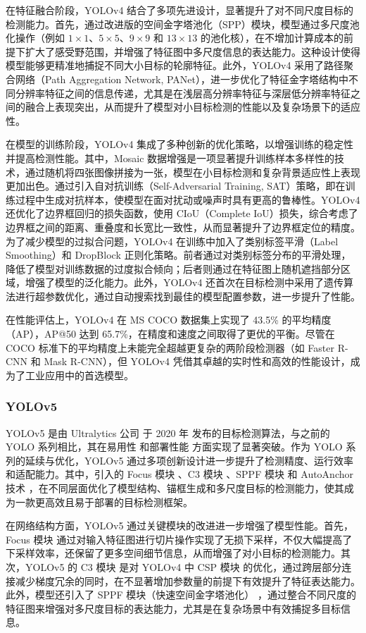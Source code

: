 \documentclass[11pt,twocolumn]{ctexart}
\begin{document}
在特征融合阶段，YOLOv4 结合了多项先进设计，显著提升了对不同尺度目标的检测能力。首先，通过改进版的空间金字塔池化（SPP）模块，模型通过多尺度池化操作（例如 $1\times1$、$5\times5$、$9\times9$ 和 $13\times13$ 的池化核），在不增加计算成本的前提下扩大了感受野范围，并增强了特征图中多尺度信息的表达能力。这种设计使得模型能够更精准地捕捉不同大小目标的轮廓特征。此外，YOLOv4 采用了路径聚合网络（Path Aggregation Network, PANet）\cite{liu2018path}，进一步优化了特征金字塔结构中不同分辨率特征之间的信息传递，尤其是在浅层高分辨率特征与深层低分辨率特征之间的融合上表现突出，从而提升了模型对小目标检测的性能以及复杂场景下的适应性。

在模型的训练阶段，YOLOv4 集成了多种创新的优化策略，以增强训练的稳定性并提高检测性能。其中，Mosaic 数据增强是一项显著提升训练样本多样性的技术，通过随机将四张图像拼接为一张，模型在小目标检测和复杂背景适应性上表现更加出色。通过引入自对抗训练（Self-Adversarial Training, SAT）策略，即在训练过程中生成对抗样本，使模型在面对扰动或噪声时具有更高的鲁棒性。YOLOv4 还优化了边界框回归的损失函数，使用 CIoU（Complete IoU）损失，综合考虑了边界框之间的距离、重叠度和长宽比一致性，从而显著提升了边界框定位的精度。为了减少模型的过拟合问题，YOLOv4 在训练中加入了类别标签平滑（Label Smoothing）和 DropBlock 正则化策略。前者通过对类别标签分布的平滑处理，降低了模型对训练数据的过度拟合倾向；后者则通过在特征图上随机遮挡部分区域，增强了模型的泛化能力。此外，YOLOv4 还首次在目标检测中采用了遗传算法进行超参数优化，通过自动搜索找到最佳的模型配置参数，进一步提升了性能。

在性能评估上，YOLOv4 在 MS COCO 数据集上实现了 43.5\% 的平均精度（AP），AP@50 达到 65.7\%，在精度和速度之间取得了更优的平衡。尽管在 COCO 标准下的平均精度上未能完全超越更复杂的两阶段检测器（如 Faster R-CNN 和 Mask R-CNN），但 YOLOv4 凭借其卓越的实时性和高效的性能设计，成为了工业应用中的首选模型。
\subsubsection{YOLOv5}
YOLOv5\cite{yolov5} 是由 Ultralytics 公司 于 2020 年 发布的目标检测算法，与之前的 YOLO 系列相比，其在易用性 和部署性能 方面实现了显著突破。作为 YOLO 系列的延续与优化，YOLOv5 通过多项创新设计进一步提升了检测精度、运行效率和适配能力。其中，引入的 Focus 模块 、C3 模块 、SPPF 模块 和 AutoAnchor 技术 ，在不同层面优化了模型结构、锚框生成和多尺度目标的检测能力，使其成为一款更高效且易于部署的目标检测框架。

在网络结构方面，YOLOv5 通过关键模块的改进进一步增强了模型性能。首先，Focus 模块 通过对输入特征图进行切片操作实现了无损下采样，不仅大幅提高了下采样效率，还保留了更多空间细节信息，从而增强了对小目标的检测能力。其次，YOLOv5 的 C3 模块 是对 YOLOv4 中 CSP 模块 的优化，通过跨层部分连接减少梯度冗余的同时，在不显著增加参数量的前提下有效提升了特征表达能力。此外，模型还引入了 SPPF 模块（快速空间金字塔池化） ，通过整合不同尺度的特征图来增强对多尺度目标的表达能力，尤其是在复杂场景中有效捕捉多目标信息。
\end{document}
